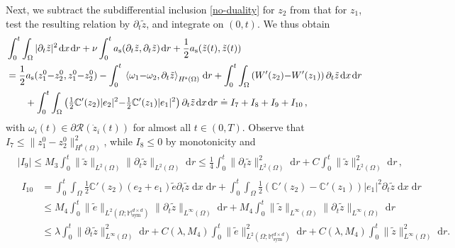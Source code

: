 \documentclass[a4paper,10pt,reqno]{amsart}
\numberwithin{equation}{section}
\newcommand{\bbM}{\mathbb{M}}
\numberwithin{equation}{section}
\def\dd{\;\!\mathrm{d}} %
\newcommand{\pairing}[4]{ \sideset{_{ #1 }}{_{ #2 }}  {\mathop{\langle #3 , #4
\rangle}}}
\newcommand{\bbC}{\mathbb{C}}
\newcommand{\mt}{\bbM}
\newcommand{\sym}{\mathrm{sym}}
\newcommand{\Did}[1]{\mathcal{R}(#1)}
\newcommand{\spz}{H^{\mathrm{s}}(\Omega)}
\newcommand{\ass}{a_{\mathrm{s}}}
\begin{document}
 \par
 Next, we subtract the subdifferential inclusion \eqref{no-duality} for $z_2$ from that for $z_1$, test the resulting relation by $\partial_t \tilde{z}$, and integrate on $(0,t)$. We thus obtain
 \begin{equation}
\label{est-tilde-z}
\begin{aligned}
&
  \int_0^t  \int_\Omega |\partial_t \tilde{z}|^2 \dd x  \dd r +\nu \int_0^t \ass( \partial_t \tilde{z}, \partial_t \tilde{z}) \dd r + \frac12 \ass (\tilde{z}(t), \tilde{z}(t)) 
  \\
  & = \frac12 \ass (z_1^0{-}z_2^0, z_1^0{-}z_2^0)  -
  \int_0^t \pairing{}{\spz}{\omega_1{-}\omega_2}{\partial_t \tilde{z}} \dd r  +    \int_0^t  \int_\Omega\left(  W'(z_2) {-}  W'(z_1)\right) \partial_t \tilde{z} \dd x \dd r
  \\
  & \qquad
   +    \int_0^t  \int_\Omega \left( \tfrac12 \bbC'(z_2) |e_2|^2 {-}\tfrac12 \bbC'(z_1) |e_1|^2 \right)  \partial_t \tilde{z} \dd x \dd r 
 \doteq I_7+I_8+I_9+I_{10}\,,
 \end{aligned}
 \end{equation}
 with $\omega_i(t) \in \partial\Did{\dot{z}_i(t)}$ for almost all $t\in (0,T)$.
 Observe that $I_7\leq \| z_1^0{-}z_2^0\|_{\spz}^2$, while $I_8\leq 0$  by monotonicity and 
 \[
 \begin{aligned}
 &
 \left| I_9 \right| \leq M_3 \int_0^t \|\tilde z \|_{L^2(\Omega)} \|\partial_t \tilde z \|_{L^2(\Omega)}  \dd r \leq \frac14 \int_0^t  \|\partial_t \tilde z \|_{L^2(\Omega)}^2 \dd r +   C \int_0^t \|\tilde z \|_{L^2(\Omega)}^2 \dd r\,, 
 \\
 &
 \begin{aligned}
 I_{10}  & =  \int_0^t  \int_\Omega \tfrac12 \bbC'(z_2) (e_2{+}e_1) \tilde{e} \partial_t \tilde{z} \dd x \dd r + \int_0^t \int_\Omega \tfrac12 \left( \bbC'(z_2) {-} \bbC'(z_1) \right) |e_1|^2   \partial_t \tilde{z}  \dd x \dd r 
 \\
 & 
 \leq M_4 \int_0^t \|\tilde{e}\|_{L^2(\Omega;\mt_\sym^{d\times d})} \| \partial_t \tilde{z} \|_{L^\infty(\Omega)}
 \dd r  + M_4 \int_0^t \|\tilde{z}\|_{L^\infty(\Omega)}  \| \partial_t \tilde{z} \|_{L^\infty(\Omega)} \dd r
 \\
 & \leq \lambda \int_0^t  \| \partial_t \tilde{z} \|_{L^\infty(\Omega)}^2 \dd r + C(\lambda,M_4) \int_0^t \|\tilde{e}\|_{L^2(\Omega;\mt_\sym^{d\times d})}^2 \dd r + C(\lambda,M_4) \int_0^t \|\tilde{z}\|_{L^\infty(\Omega)}^2 \dd r.
\end{aligned}
 \end{aligned}
 \]
\end{document}
